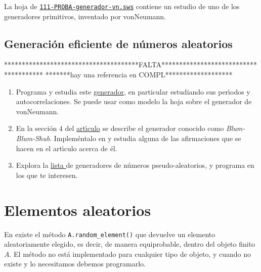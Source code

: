  La hoja de 
\href{http://sage.mat.uam.es:8888/home/pub/??/}{\tt 111-PROBA-generador-vn.sws}
contiene un estudio de uno de los generadores primitivos, inventado por
vonNeumann.

\subsection{Generaci\'on eficiente de n\'umeros aleatorios} 
**************************************FALTA**************************************
*******hay una referencia en COMPL*******************

\begin{ejer}
 
 \begin{enumerate}
  \item Programa y estudia este 
  \href{http://en.wikipedia.org/wiki/Linear_congruential_generator}{generador},
en particular estudiando sus per\'{\i}odos y autocorrelaciones.  Se puede usar
como modelo la hoja sobre el generador de vonNeumann.


  \item En la secci\'on $4$ del \href{run:PDFs/PROBA/bbs.pdf}{art\'{\i}culo} se
describe el generador conocido como {\itshape Blum-Blum-Shub}. Implem\'entalo en
{\sage} y estudia alguna de las afirmaciones que se hacen en el art\'{\i}culo
acerca de \'el.
  

 \item Explora la
\href{http://en.wikipedia.org/wiki/List_of_pseudorandom_number_generators}{lista
} de generadores de n\'umeros pseudo-aleatorios,   y programa en {\sage} los que
te interesen. 


  
 \end{enumerate}
 \end{ejer}
\section{Elementos aleatorios}
 
 
 En {\sage} existe el m\'etodo \lstinline|A.random_element()| que devuelve un 
elemento aleatoriamente elegido, es decir, de manera equiprobable, dentro del 
objeto finito $A$. El m\'etodo no est\'a implementado para cualquier tipo de 
objeto, y cuando no existe y lo necesitamos debemos programarlo. 
 
